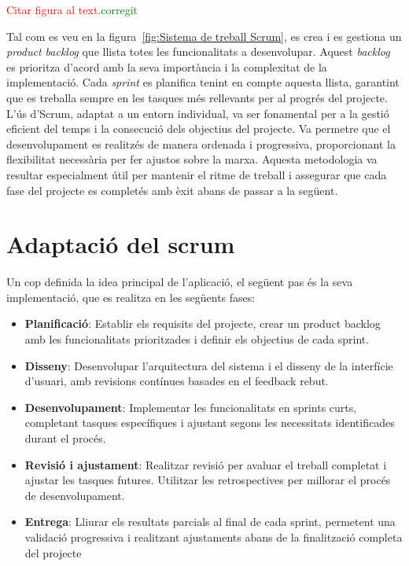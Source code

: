 \documentclass[a4paper,12pt,twoside]{ThesisStyle}
\newcommand{\pau}[1]{\textcolor{red}{#1}}
\newcommand{\sudan}[1]{\textcolor{green}{#1}}
\begin{document}
  \pau{Citar figura al text.}\sudan{corregit}

Tal com es veu en la figura~\ref{fig:Sistema de treball Scrum}, es crea i es gestiona un \textit{product backlog} que llista totes les funcionalitats a desenvolupar. Aquest \textit{backlog} es prioritza d'acord amb la seva importància i la complexitat de la implementació. Cada \textit{sprint} es planifica tenint en compte aquesta llista, garantint que es treballa sempre en les tasques més rellevants per al progrés del projecte.\\

L'ús d'Scrum, adaptat a un entorn individual, va ser fonamental per a la gestió eficient del temps i la consecució dels objectius del projecte. Va permetre que el desenvolupament es realitzés de manera ordenada i progressiva, proporcionant la flexibilitat necessària per fer ajustos sobre la marxa. Aquesta metodologia va resultar especialment útil per mantenir el ritme de treball i assegurar que cada fase del projecte es completés amb èxit abans de passar a la següent.


\section{Adaptació del scrum}
\label{subsec: Adaptació del scrum}

Un cop definida la idea principal de l'aplicació, el següent pas és la seva implementació, que es realitza en les següents fases:

\begin{itemize} 
    \item \textbf{Planificació}: Establir els requisits del projecte, crear un product backlog amb les funcionalitats prioritzades i definir els objectius de cada sprint.
    \item \textbf{Disseny}: Desenvolupar l'arquitectura del sistema i el disseny de la interfície d'usuari, amb revisions contínues basades en el feedback rebut. 
    \item \textbf{Desenvolupament}: Implementar les funcionalitats en sprints curts, completant tasques específiques i ajustant segons les necessitats identificades durant el procés. 
    \item \textbf{Revisió i ajustament}: Realitzar revisió per avaluar el treball completat i ajustar les tasques futures. Utilitzar les retrospectives per millorar el procés de desenvolupament. 
    \item \textbf{Entrega}: Lliurar els resultats parcials al final de cada sprint, permetent una validació progressiva i realitzant ajustaments abans de la finalització completa del projecte
\end{itemize}
\end{document}
